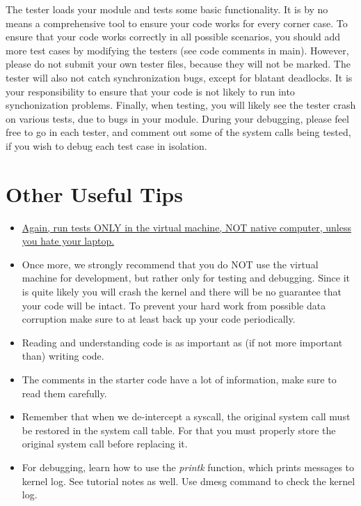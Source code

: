 \documentclass[12pt]{article}
\begin{document}
\begin{itemize}
\begin{itemize}
        \bigskip

        The tester loads your module and tests some basic functionality. It is by no means a comprehensive tool to ensure
        your code works for every corner case. To ensure that your code works correctly in all possible scenarios, you should
        add more test cases by modifying the testers (see code comments in main). However, please do not submit your own
        tester files, because they will not be marked. The tester will also not catch synchronization bugs, except for
        blatant deadlocks. It is your responsibility to ensure that your code is not likely to run into synchonization
        problems. Finally, when testing, you will likely see the tester crash on various tests, due to bugs in your module.
        During your debugging, please feel free to go in each tester, and comment out some of the system calls being tested,
        if you wish to debug each test case in isolation.
    \end{itemize}

    \section{Other Useful Tips}

    \bigskip

    \begin{itemize}
        \item \ul{Again, run tests ONLY in the virtual machine, NOT native computer, unless you hate your laptop.}
        \item Once more, we strongly recommend that you do NOT use the virtual machine for development, but rather only for testing and debugging. Since it is quite likely you will crash the kernel and there will be no guarantee that your code will be intact. To prevent your hard work from possible data corruption make sure to at least back up your code periodically.
        \item Reading and understanding code is as important as (if not more important than) writing code.
        \item The comments in the starter code have a lot of information, make sure to read them carefully.
        \item Remember that when we de-intercept a syscall, the original system call must be restored in the system call table. For that you must properly store the original system call before replacing it.
        \item For debugging, learn how to use the \textit{printk} function, which prints messages to kernel log. See tutorial notes as well.
    Use dmesg command to check the kernel log.
    \end{itemize}
\end{itemize}
\end{document}
